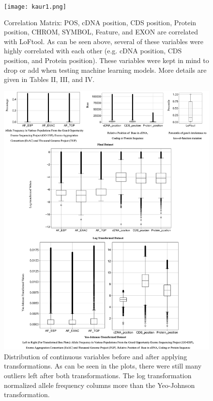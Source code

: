 \documentclass[journal,two side,web]{ieeecolor}
\begin{document}
\clearpage
\begin{figure}[!t]
\centerline{\texttt{[image: kaur1.png]}}
\caption{Correlation Matrix:  POS, cDNA position, CDS position, Protein position,
CHROM, SYMBOL, Feature, and EXON are correlated with LoFtool. As can be seen above, several of these variables were highly correlated with each other (e.g. cDNA position, CDS position, and Protein position). These variables were kept in mind to drop or add when testing machine learning models. More details are given in Tables II, III, and IV.}
\label{fig1}
\end{figure}

\clearpage
 \begin{figure}[!t]
 \centering
 \includegraphics[width=\textwidth]{kaur2.png}
\caption{Distribution of continuous variables before and after applying transformations. As can be seen in the plots, there were still many outliers left after both transformations. The log transformation normalized allele frequency columns more than the Yeo-Johnson transformation.}
\label{fig1}
\end{figure}
\end{document}

